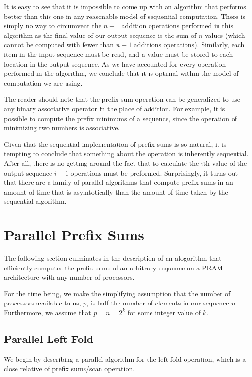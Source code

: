 \documentclass[12pt,twoside]{reedthesis}
\begin{document}
It is easy to see that it is impossible to come up with an algorithm
that performs better than this one in any reasonable model of
sequential computation. There is simply no way to circumvent the $n-1$
addition operations performed in this algorithm as the final
value of our output sequence is the sum of $n$ values (which cannot be
computed with fewer than $n-1$ additions operations). Similarly, each
item in the input sequence must be read, and a value must be stored to
each location in the output sequence.  As we have accounted for every operation performed in the algorithm, we conclude that it is optimal within the model of computation we are using.

The reader should note that the prefix sum operation can be
generalized to use any binary associative operator in the place of
addition. For example, it is possible to compute the prefix minimums
of a sequence, since the operation of minimizing two numbers is associative.

Given that the sequential implementation of prefix sums is so natural,
it is tempting to conclude that something about the operation is
inherently sequential. After all, there is no getting around the fact
that to calculate the $i$th value of the output sequence
$i-1$ operations must be preformed. Surprisingly, it turns out that
there are a family of parallel algorithms that compute prefix sums in
an amount of time that is asymtotically than the amount of
time taken by the sequential algorithm.


\section{Parallel Prefix Sums}

The following section culminates in the description of an alogorithm
that efficiently computes the prefix sums of an arbitrary sequence on
a PRAM architecture with any number of processors.

For the time being, we make the simplifying assumption that the number of processors available to us, $p$, is half the number of elements in our sequence $n$. Furthermore, we assume that $p=n=2^k$ for some integer value of $k$.

\vspace{1pc}
\subsection{Parallel Left Fold}
We begin by describing a parallel algorithm for the left fold operation, which is a close relative of prefix sums/scan operation.
\end{document}
